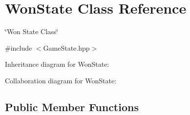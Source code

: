 \hypertarget{classWonState}{}\section{Won\+State Class Reference}
\label{classWonState}


\char`\"{}\+Won State Class\char`\"{}  




{\ttfamily \#include $<$Game\+State.\+hpp$>$}



Inheritance diagram for Won\+State\+:


Collaboration diagram for Won\+State\+:
\subsection*{Public Member Functions}
